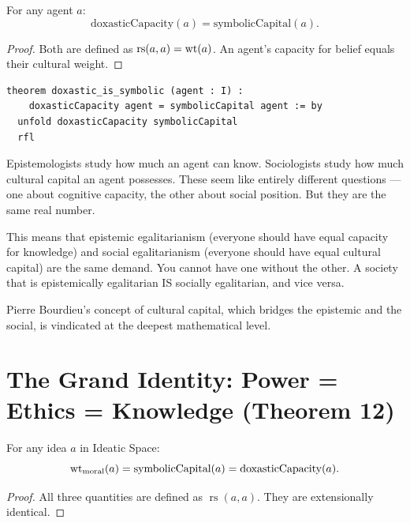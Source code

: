 \begin{theorem}
\label{thm:doxastic-symbolic}
For any agent $a$:
\[
\text{doxasticCapacity}(a) = \text{symbolicCapital}(a).
\]
\end{theorem}

\begin{proof}
Both are defined as $\operatorname{rs}(a, a) = \operatorname{wt}(a)$.  An agent's capacity for belief equals their cultural weight.
\end{proof}

\begin{lstlisting}
theorem doxastic_is_symbolic (agent : I) :
    doxasticCapacity agent = symbolicCapital agent := by
  unfold doxasticCapacity symbolicCapital
  rfl
\end{lstlisting}

\begin{interpretation}
Epistemologists study how much an agent can know.  Sociologists study how much cultural capital an agent possesses.  These seem like entirely different questions --- one about cognitive capacity, the other about social position.  But they are the same real number.

This means that epistemic egalitarianism (everyone should have equal capacity for knowledge) and social egalitarianism (everyone should have equal cultural capital) are the same demand.  You cannot have one without the other.  A society that is epistemically egalitarian IS socially egalitarian, and vice versa.

Pierre Bourdieu's concept of cultural capital, which bridges the epistemic and the social, is vindicated at the deepest mathematical level.
\end{interpretation}


\section{The Grand Identity: Power = Ethics = Knowledge (Theorem 12)}

\begin{theorem}
\label{thm:grand-identity}
For any idea $a$ in Ideatic Space:
\[
\operatorname{wt}_{\text{moral}}(a) = \text{symbolicCapital}(a) = \text{doxasticCapacity}(a).
\]
\end{theorem}

\begin{proof}
All three quantities are defined as $\operatorname{rs}(a, a)$.  They are extensionally identical.
\end{proof}

